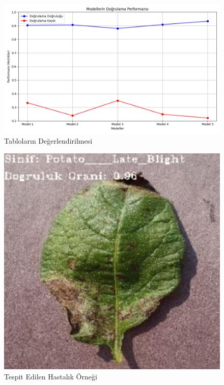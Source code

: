 \documentclass[12pt,a4paper]{article}
\begin{document}
\begin{enumerate}
\begin{enumerate}
\begin{table}[htbp]
{\begin{tabular}{|c|l|}
			\hline
		\end{tabular}%
	}
\end{table}		
\begin{figure}[h]
	\centering
	\includegraphics[width=\textwidth]{tablolar.png}
	\caption{Tabloların Değerlendirilmesi}
	\label{fig:grafik}
\end{figure}
\begin{figure}[h]
	\centering
	\includegraphics[width=\textwidth]{potato.png}
	\caption{Tespit Edilen Hastalık Örneği}
	\label{fig:grafik}
\end{figure}						
			\end{enumerate}
		\end{enumerate}
\end{document}
